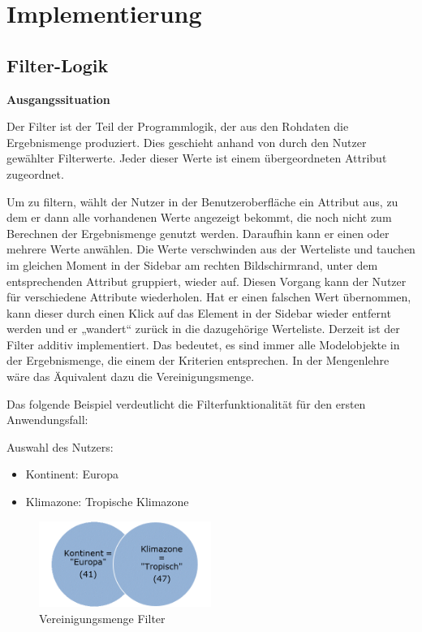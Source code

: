 \chapter{Implementierung}
\section{Filter-Logik} \label{sec:implFilter}
\textbf{Ausgangssituation}

Der Filter ist der Teil der Programmlogik, der aus den Rohdaten die Ergebnismenge produziert. Dies geschieht anhand von durch den Nutzer gewählter Filterwerte. Jeder dieser Werte ist einem übergeordneten Attribut zugeordnet.

Um zu filtern, wählt der Nutzer in der Benutzeroberfläche ein Attribut aus, zu dem er dann alle vorhandenen Werte angezeigt bekommt, die noch nicht zum Berechnen der Ergebnismenge genutzt werden. Daraufhin kann er einen oder mehrere Werte anwählen. Die Werte verschwinden aus der Werteliste und tauchen im gleichen Moment in der Sidebar am rechten Bildschirmrand, unter dem entsprechenden Attribut gruppiert, wieder auf. Diesen Vorgang kann der Nutzer für verschiedene Attribute wiederholen. Hat er einen falschen Wert übernommen, kann dieser durch einen Klick auf das Element in der Sidebar wieder entfernt werden und er „wandert“ zurück in die dazugehörige Werteliste.
Derzeit ist der Filter additiv implementiert. Das bedeutet, es sind immer alle Modelobjekte in der Ergebnismenge, die einem der Kriterien entsprechen. In der Mengenlehre wäre das Äquivalent dazu die Vereinigungsmenge.

Das folgende Beispiel verdeutlicht die Filterfunktionalität für den ersten Anwendungsfall:

Auswahl des Nutzers:

\begin{itemize}
	\item Kontinent: Europa
	\item Klimazone: Tropische Klimazone
\end{itemize}

\begin{figure}[H]
 \centering
 \includegraphics[width=0.5\textwidth]{grafiken/Filter_Vereinigung.png}
 \caption{Vereinigungsmenge Filter}
 \label{fig:filter1}
\end{figure}


